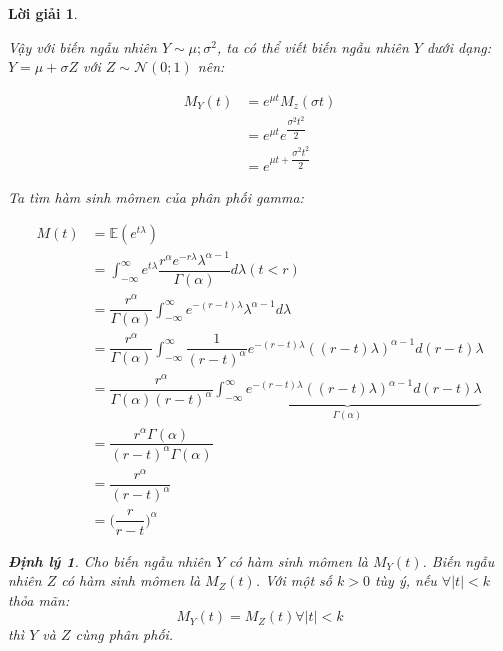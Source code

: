 \documentclass[14pt, a4paper]{article}
\newtheorem{dl}{Định lý}
\theoremstyle{sltheorem}
\theoremstyle{soltheorem}
\newtheorem*{loigiai}{Lời giải}
\begin{document}
\begin{loigiai}
\begin{enumerate}
        Vậy với biến ngẫu nhiên $Y \sim \mathcal{\mu; \sigma^2}$, ta có thể viết biến ngẫu nhiên $Y$ dưới dạng: $Y = \mu + \sigma Z$ với $Z \sim \mathcal{N}(0;1)$ nên:

        \begin{equation*}
            \begin{aligned}
                M_Y(t) &= e^{\mu t} M_z(\sigma t) \\
                &= e^{\mu t} e^{\dfrac{\sigma^2 t^2}{2}} \\
                &= e^{\mu t + \dfrac{\sigma^2 t^2}{2}}
            \end{aligned}
        \end{equation*}

        Ta tìm hàm sinh mômen của phân phối gamma:

        \begin{equation*}
            \begin{aligned}
                M(t) &= \mathbb{E}(e^{t\lambda}) \\
                &= \int_{-\infty}^{\infty} e^{t\lambda} \dfrac{r^{\alpha}e^{-r\lambda} \lambda^{\alpha-1}}{\Gamma(\alpha)} d\lambda (t < r) \\
                &= \dfrac{r^{\alpha}}{\Gamma(\alpha)} \int_{-\infty}^{\infty} e^{-(r-t)\lambda} \lambda^{\alpha-1} d \lambda \\
                &= \dfrac{r^{\alpha}}{\Gamma(\alpha)} \int_{-\infty}^{\infty} \dfrac{1}{(r-t)^{\alpha}} e^{-(r-t)\lambda} ((r-t)\lambda)^{\alpha-1} d (r-t)\lambda \\
                &= \dfrac{r^{\alpha}}{\Gamma(\alpha)(r-t)^{\alpha}} \underbrace{\int_{-\infty}^{\infty} e^{-(r-t)\lambda} ((r-t)\lambda)^{\alpha-1} d (r-t)\lambda}_{\Gamma(\alpha)} \\
                &= \dfrac{r^{\alpha} \Gamma(\alpha)}{(r-t)^{\alpha}\Gamma(\alpha)} \\
                &= \dfrac{r^{\alpha}}{(r-t)^{\alpha}} \\
                &= \Big( \dfrac{r}{r-t} \Big)^{\alpha}
            \end{aligned}
        \end{equation*}

        \begin{dl} \label{dl:1}
            Cho biến ngẫu nhiên $Y$ có hàm sinh mômen là $M_Y(t)$. 
            Biến ngẫu nhiên $Z$ có hàm sinh mômen là $M_Z(t)$.
            Với một số $k > 0$ tùy ý, nếu $\forall \lvert t \rvert < k$ thỏa mãn:
            \begin{equation*}
                M_Y(t) = M_Z(t) \forall \lvert t \vert < k
            \end{equation*}
            thì $Y$ và $Z$ cùng phân phối.
        \end{dl}


\end{enumerate}
\end{loigiai}
\end{document}
